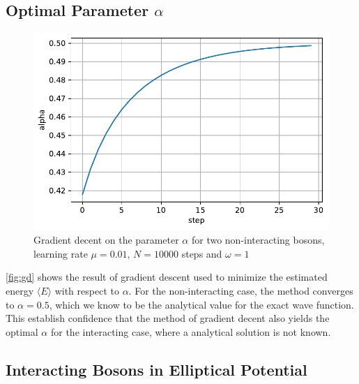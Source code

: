 \subsection{Optimal Parameter \(\alpha\)}
\begin{figure}
	\includegraphics[width=.8\linewidth]{figures/gd.pdf}
	\centering
	\caption{Gradient decent on the parameter $\alpha$ for two non-interacting bosons, learning rate $\mu = 0.01$, $N = 10000$ steps and $\omega = 1$}
	\label{fig:gd}
\end{figure}

\autoref{fig:gd} shows the result of gradient descent used to minimize the estimated energy $\langle E \rangle$ with respect to $\alpha$. For the non-interacting case, the method converges to $\alpha = 0.5$, which we know to be the analytical value for the exact wave function. This establish confidence that the method of gradient decent also yields the optimal $\alpha$ for the interacting case, where a analytical solution is not known. 

\subsection{Interacting Bosons in Elliptical Potential}



